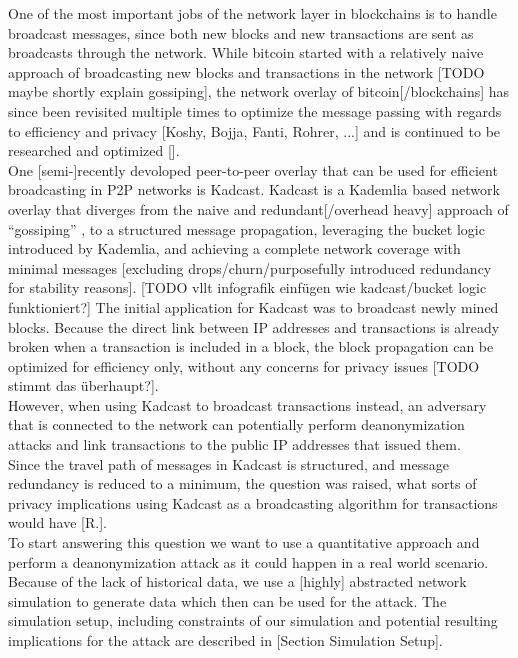 One of the most important jobs of the network layer in blockchains is to handle broadcast messages, since
both new blocks and new transactions are sent as broadcasts through the network.
While bitcoin started with a relatively naive approach of broadcasting new blocks and transactions in the network [TODO maybe shortly explain gossiping],
the network overlay of bitcoin[/blockchains] has since been revisited multiple times to optimize the message passing with regards to efficiency and privacy [Koshy, Bojja, Fanti, Rohrer, ...] and is continued to be researched and optimized []. \\
One [semi-]recently devoloped peer-to-peer overlay that can be used for efficient broadcasting in P2P networks is Kadcast.
Kadcast is a Kademlia based network overlay that diverges from the naive and redundant[/overhead heavy] approach of ``gossiping'' , to a structured message propagation, leveraging the bucket logic introduced by Kademlia, and achieving a complete network coverage with minimal messages
[excluding drops/churn/purposefully introduced redundancy for stability reasons]. [TODO vllt infografik einfügen wie kadcast/bucket logic funktioniert?]
The initial application for Kadcast was to broadcast newly mined blocks. Because the direct link between IP addresses and transactions is already broken when a transaction is included in a block, the block propagation can be optimized for efficiency only, without any concerns for privacy issues [TODO stimmt das überhaupt?]. \\
However, when using Kadcast to broadcast transactions instead, an adversary that is connected to the network can potentially perform
deanonymization attacks and link transactions to the public IP addresses that issued them. \\
Since the travel path of messages in Kadcast is structured, and message redundancy is reduced to a minimum, the question was raised, what sorts of privacy implications using Kadcast as a broadcasting algorithm for transactions would have [R.]. \\
To start answering this question we want to use a quantitative approach and perform a deanonymization attack
as it could happen in a real world scenario. Because of the lack of historical data, we use a [highly] abstracted network
simulation to generate data which then can be used for the attack. The simulation setup, including constraints of our simulation and potential resulting implications for the attack are described in [Section Simulation Setup]. \\
